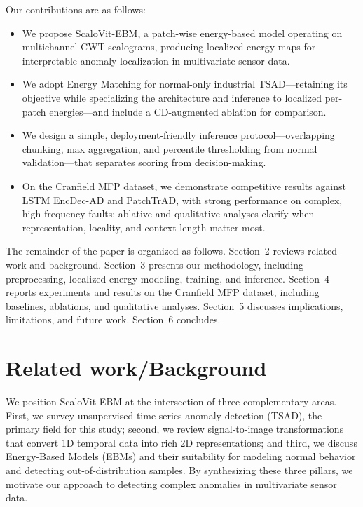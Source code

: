 \documentclass{article}
\begin{document}
Our contributions are as follows:
\begin{itemize}
    \item We propose ScaloVit-EBM, a patch-wise energy-based model operating on multichannel CWT scalograms, producing localized energy maps for interpretable anomaly localization in multivariate sensor data.
    \item We adopt Energy Matching \citep{balcerak2025energymatchingunifyingflow} for normal-only industrial TSAD—retaining its objective while specializing the architecture and inference to localized per-patch energies—and include a CD-augmented ablation for comparison.
    \item We design a simple, deployment-friendly inference protocol—overlapping chunking, max aggregation, and percentile thresholding from normal validation—that separates scoring from decision-making.
    \item On the Cranfield MFP dataset, we demonstrate competitive results against LSTM EncDec-AD and PatchTrAD, with strong performance on complex, high-frequency faults; ablative and qualitative analyses clarify when representation, locality, and context length matter most.
\end{itemize}

The remainder of the paper is organized as follows. Section~2 reviews related work and background. Section~3 presents our methodology, including preprocessing, localized energy modeling, training, and inference. Section~4 reports experiments and results on the Cranfield MFP dataset, including baselines, ablations, and qualitative analyses. Section~5 discusses implications, limitations, and future work. Section~6 concludes.


\section{Related work/Background}
We position ScaloVit‑EBM at the intersection of three complementary areas. First, we survey unsupervised time‑series anomaly detection (TSAD), the primary field for this study; second, we review signal‑to‑image transformations that convert 1D temporal data into rich 2D representations; and third, we discuss Energy‑Based Models (EBMs) and their suitability for modeling normal behavior and detecting out‑of‑distribution samples. By synthesizing these three pillars, we motivate our approach to detecting complex anomalies in multivariate sensor data.
\end{document}
